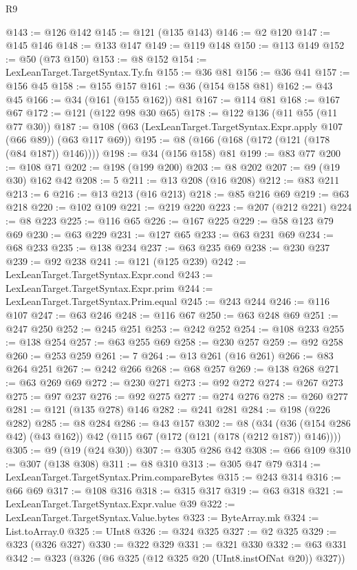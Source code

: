 \begin{lexlean}{R9}
\begin{coremodule}
{{{{{{{{{{{{{{{@143 := @126 @142
@145 := @121 (@135 @143)
@146 := @2 @120
@147 := @145 @146
@148 := @133 @147
@149 := @119 @148
@150 := @113 @149
@152 := @50 (@73 @150)
@153 := @8 @152
@154 := LexLeanTarget.TargetSyntax.Ty.fn
@155 := @36 @81
@156 := @36 @41
@157 := @156 @45
@158 := @155 @157
@161 := @36 (@154 @158 @81)
@162 := @43 @45
@166 := @34 (@161 (@155 @162)) @81
@167 := @114 @81
@168 := @167 @67
@172 := @121 (@122 @98 @30 @65)
@178 := @122 @136 (@11 @55 (@11 @77 @30))
@187 := @108 (@63 (LexLeanTarget.TargetSyntax.Expr.apply @107 (@66 @89)) (@63 @117 @69))
@195 := @8 (@166 (@168 (@172 (@121 (@178 (@84 @187)) @146))))
@198 := @34 (@156 @158) @81
@199 := @83 @77
@200 := @108 @71
@202 := @198 (@199 @200)
@203 := @8 @202
@207 := @9 (@19 @30) @162 @42
@208 := 5
@211 := @13 @208 (@16 @208)
@212 := @83 @211
@213 := 6
@216 := @13 @213 (@16 @213)
@218 := @85 @216 @69
@219 := @63 @218
@220 := @102 @109
@221 := @219 @220
@223 := @207 (@212 @221)
@224 := @8 @223
@225 := @116 @65
@226 := @167 @225
@229 := @58 @123 @79 @69
@230 := @63 @229
@231 := @127 @65
@233 := @63 @231 @69
@234 := @68 @233
@235 := @138 @234
@237 := @63 @235 @69
@238 := @230 @237
@239 := @92 @238
@241 := @121 (@125 @239)
@242 := LexLeanTarget.TargetSyntax.Expr.cond
@243 := LexLeanTarget.TargetSyntax.Expr.prim
@244 := LexLeanTarget.TargetSyntax.Prim.equal
@245 := @243 @244
@246 := @116 @107
@247 := @63 @246
@248 := @116 @67
@250 := @63 @248 @69
@251 := @247 @250
@252 := @245 @251
@253 := @242 @252
@254 := @108 @233
@255 := @138 @254
@257 := @63 @255 @69
@258 := @230 @257
@259 := @92 @258
@260 := @253 @259
@261 := 7
@264 := @13 @261 (@16 @261)
@266 := @83 @264 @251
@267 := @242 @266
@268 := @68 @257
@269 := @138 @268
@271 := @63 @269 @69
@272 := @230 @271
@273 := @92 @272
@274 := @267 @273
@275 := @97 @237
@276 := @92 @275
@277 := @274 @276
@278 := @260 @277
@281 := @121 (@135 @278) @146
@282 := @241 @281
@284 := @198 (@226 @282)
@285 := @8 @284
@286 := @43 @157
@302 := @8
    (@34 (@36 (@154 @286 @42) (@43 @162)) @42 (@115 @67 (@172 (@121 (@178 (@212 @187)) @146))))
@305 := @9 (@19 (@24 @30))
@307 := @305 @286 @42
@308 := @66 @109
@310 := @307 (@138 @308)
@311 := @8 @310
@313 := @305 @47 @79
@314 := LexLeanTarget.TargetSyntax.Prim.compareBytes
@315 := @243 @314
@316 := @66 @69
@317 := @108 @316
@318 := @315 @317
@319 := @63 @318
@321 := LexLeanTarget.TargetSyntax.Expr.value @39
@322 := LexLeanTarget.TargetSyntax.Value.bytes
@323 := ByteArray.mk
@324 := List.toArray.{0}
@325 := UInt8
@326 := @324 @325
@327 := @2 @325
@329 := @323 (@326 @327)
@330 := @322 @329
@331 := @321 @330
@332 := @63 @331
@342 := @323 (@326 (@6 @325 (@12 @325 @20 (UInt8.instOfNat @20)) @327))
}}}}}}}}}}}}}}}
\end{coremodule}
\end{lexlean}
